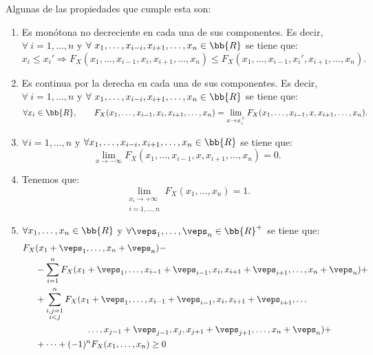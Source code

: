 Algunas de las propiedades que cumple esta son:
\begin{enumerate}
    \item Es monótona no decreciente en cada una de sus componentes. Es decir, $\forall~i=1, \ldots, n$ y $\forall~x_1, \dots, x_{i-i}, x_{i+1}, \dots, x_n \in \bb{R}$ se tiene que:
    \begin{equation*}
        x_i \leq x_i'
        \Longrightarrow
        F_X(x_1, \ldots, x_{i-1}, x_i, x_{i+1}, \ldots, x_n) \leq F_X(x_1, \ldots, x_{i-1}, x_i', x_{i+1}, \ldots, x_n).
    \end{equation*}

    \item Es continua por la derecha en cada una de sus componentes. Es decir, $\forall~i=1, \ldots, n$ y $\forall~x_1, \dots, x_{i-i}, x_{i+1}, \dots, x_n \in \bb{R}$ se tiene que:
    \begin{equation*}
        \forall x_i\in \bb{R},\qquad F_X(x_1, \ldots, x_{i-1}, x_i, x_{i+1}, \ldots, x_n) = \lim_{x\to x_i^+} F_X(x_1, \ldots, x_{i-1}, x, x_{i+1}, \ldots, x_n).
    \end{equation*}

    \item $\forall i=1, \ldots, n$ y $\forall x_1, \dots, x_{i-i}, x_{i+1}, \dots, x_n \in \bb{R}$ se tiene que:
    \begin{equation*}
        \lim_{x\to -\infty} F_X(x_1, \ldots, x_{i-1}, x, x_{i+1}, \ldots, x_n) = 0.
    \end{equation*}

    \item Tenemos que:
    \begin{equation*}
        \lim_{\substack{x_i\to +\infty\\i=1, \ldots, n}} F_X(x_1, \ldots, x_n) = 1.
    \end{equation*}

    \item $\forall x_1, \ldots, x_n \in \bb{R}$ y $\forall \veps_1, \ldots, \veps_n\in \bb{R}^+$ se tiene que:
    \begin{align*}
        F_X&(x_1+\veps_1, \ldots, x_n+\veps_n) -\\
        &- \sum_{i=1}^n F_X(x_1 + \veps_1, \ldots, x_{i-1} + \veps_{i-1}, x_i, x_{i+1} + \veps_{i+1}, \ldots, x_n+\veps_n) +\\
        &+ \sum_{\substack{i,j=1\\i<j}}^n F_X(x_1 + \veps_1, \ldots, x_{i-1} + \veps_{i-1}, x_i, x_{i+1} + \veps_{i+1},
        \ldots\\&\hspace{2cm}\ldots, x_{j-1} + \veps_{j-1}, x_j, x_{j+1} + \veps_{j+1}, \ldots, x_n+\veps_n) +\\
        &+\dots+(-1)^n F_X(x_1, \ldots, x_n) \geq 0
    \end{align*}

\end{enumerate}

